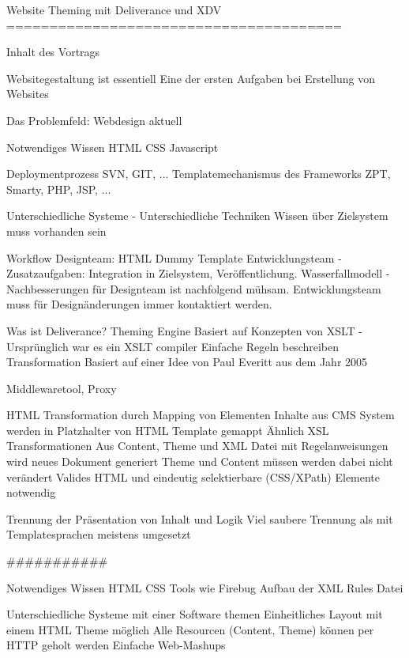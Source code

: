 Website Theming mit Deliverance und XDV
=======================================


Inhalt des Vortrags

Websitegestaltung ist essentiell
    Eine der ersten Aufgaben bei Erstellung von Websites

Das Problemfeld: Webdesign aktuell

    Notwendiges Wissen
        HTML
        CSS
        Javascript

        Deploymentprozess
            SVN, GIT, ...
        Templatemechanismus des Frameworks
            ZPT, Smarty, PHP, JSP, ...

        Unterschiedliche Systeme - Unterschiedliche Techniken
        Wissen über Zielsystem muss vorhanden sein

    Workflow
        Designteam: HTML Dummy Template
        Entwicklungsteam - Zusatzaufgaben: Integration in Zielsystem, Veröffentlichung.
        Wasserfallmodell - Nachbesserungen für Designteam ist nachfolgend mühsam. Entwicklungsteam muss für Designänderungen immer kontaktiert werden.



Was ist Deliverance?
    Theming Engine
        Basiert auf Konzepten von XSLT - Ursprünglich war es ein XSLT compiler
        Einfache Regeln beschreiben Transformation
        Basiert auf einer Idee von Paul Everitt aus dem Jahr 2005

    Middlewaretool, Proxy %

    HTML Transformation durch Mapping von Elementen %
        Inhalte aus CMS System werden in Platzhalter von HTML Template gemappt
        Ähnlich XSL Transformationen
        Aus Content, Theme und XML Datei mit Regelanweisungen wird neues Dokument generiert
        Theme und Content müssen werden dabei nicht verändert
        Valides HTML und eindeutig selektierbare (CSS/XPath) Elemente notwendig

    Trennung der Präsentation von Inhalt und Logik
        Viel saubere Trennung als mit Templatesprachen meistens umgesetzt

###########

    Notwendiges Wissen
        HTML
        CSS
        Tools wie Firebug
        Aufbau der XML Rules Datei

    Unterschiedliche Systeme mit einer Software themen
        Einheitliches Layout mit einem HTML Theme möglich
        Alle Resourcen (Content, Theme) können per HTTP geholt werden
        Einfache Web-Mashups

